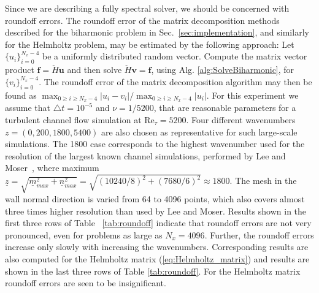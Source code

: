 \documentclass[preprint]{elsarticle}
\newcommand{\N}[1]{\check{#1}}
\begin{document}
Since we are describing a fully spectral solver, we should be concerned with roundoff errors. The roundoff error of the matrix decomposition methods 
described for the biharmonic problem in Sec.~\ref{sec:implementation}, and similarly for the Helmholtz problem, may be estimated 
by the following approach: Let $\{u_i\}_{i=0}^{N_x-4}$ be a uniformly distributed 
random vector. Compute the matrix vector product $\bm{f}=\N{H}\bm{u}$ and 
then solve $\N{H} \bm{v} = \bm{f}$, using Alg. \ref{alg:SolveBiharmonic}, for 
$\{v_i\}_{i=0}^{N_x-4}$. The roundoff error of the matrix decomposition 
algorithm may then be found as $\max_{0 \ge i \ge N_x-4}|u_i-v_i|/\max_{0 \ge i 
\ge N_x-4}|u_i|$. For this experiment we assume that $\triangle t= 10^{-5}$ 
and $\nu=1/5200$, that are reasonable parameters for a turbulent channel flow 
simulation at $\text{Re}_{\tau}=5200$. Four different wavenumbers 
$z=(0, 200, 1800, 5400)$ are 
also chosen as representative for such large-scale simulations. The 1800 case corresponds to the highest wavenumber used for the resolution 
of the largest known channel simulations, performed by Lee and 
Moser~\cite{leemoser15}, where maximum $\underline{z} = \sqrt{\underline{m}_{max}^2+\underline{n}_{max}^2} = \sqrt{(10240/8)^2 + (7680/6)^2} \approx 1800$. The mesh in the wall normal direction 
is varied from 64 to 4096 points, which also covers almost three times higher 
resolution than used by Lee and Moser. Results shown in the 
first three rows of Table ~\ref{tab:roundoff} indicate that 
roundoff errors are not very pronounced, even for problems as large as 
$N_x=4096$. Further, the roundoff errors increase only slowly with increasing 
the wavenumbers. Corresponding results are also computed for the Helmholtz 
matrix (\ref{eq:Helmholtz_matrix}) and 
results are shown in the last three rows of Table \ref{tab:roundoff}. For 
the Helmholtz matrix roundoff errors are seen to be insignificant.
\end{document}
